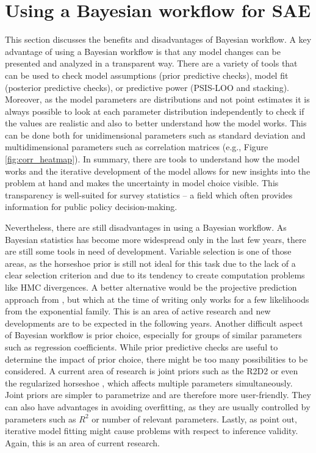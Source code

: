 \section{Using a Bayesian workflow for SAE}

This section discusses the benefits and disadvantages of Bayesian workflow.
A key advantage of using a Bayesian workflow is that any model changes can be presented and analyzed in a transparent way.
There are a variety of tools that can be used to check model assumptions (prior predictive checks), model fit (posterior predictive checks), or predictive power (PSIS-LOO and stacking).
Moreover, as the model parameters are distributions and not point estimates it is always possible to look at each parameter distribution independently to check if the values are realistic and also to better understand how the model works.
This can be done both for unidimensional parameters such as standard deviation and multidimensional parameters such as correlation matrices (e.g., Figure \ref{fig:corr_heatmap}).
In summary, there are tools to understand how the model works and the iterative development of the model allows for new insights into the problem at hand and makes the uncertainty in model choice visible.
This transparency is well-suited for survey statistics – a field which often provides information for public policy decision-making.

Nevertheless, there are still disadvantages in using a Bayesian workflow.
As Bayesian statistics has become more widespread only in the last few years, there are still some tools in need of development.
Variable selection is one of those areas, as the horseshoe prior is still not ideal for this task due to the lack of a clear selection criterion and due to its tendency to create computation problems like HMC divergences.
A better alternative would be the projective prediction approach from \cite{piironen_projective_2020}, but which at the time of writing only works for a few likelihoods from the exponential family.
This is an area of active research and new developments are to be expected in the following years.
Another difficult aspect of Bayesian workflow is prior choice, especially for groups of similar parameters such as regression coefficients.
While prior predictive checks are useful to determine the impact of prior choice, there might be too many possibilities to be considered.
A current area of research is joint priors such as the R2D2 \citep{zhang_bayesian_2020} or even the regularized horseshoe \citep{piironen_sparsity_2017}, which affects multiple parameters simultaneously.
Joint priors are simpler to parametrize and are therefore more user-friendly.
They can also have advantages in avoiding overfitting, as they are usually controlled by parameters such as $R^2$ or number of relevant parameters.
Lastly, as \cite{gelman_bayesian_2020} point out, iterative model fitting might cause problems with respect to inference validity.
Again, this is an area of current research.

